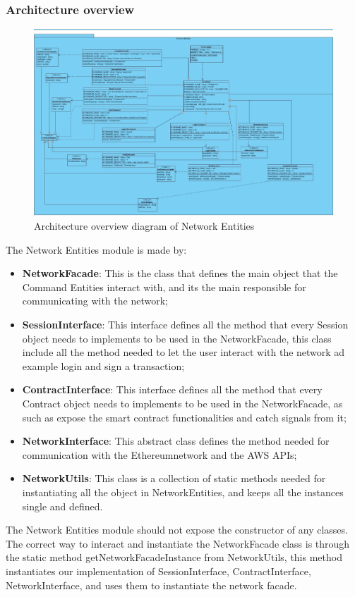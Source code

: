 \subsubsection{Architecture overview}
\begin{figure}[h]
	\centering
	\includegraphics[width=\textwidth]{./res/img/NetworkFacade.png}
	\caption{Architecture overview diagram of Network Entities}
\end{figure}
The Network Entities module is made by:
\begin{itemize}
    \item \textbf{NetworkFacade}: This is the class that defines the main object that the Command Entities interact with, and its the main responsible for communicating with the network;
    \item \textbf{SessionInterface}: This interface defines all the method that every Session object needs to implements to be used in the NetworkFacade, this class include all the method needed to let the user interact with the network ad example login and sign a transaction;
    \item \textbf{ContractInterface}: This interface defines all the method that every Contract object needs to implements to be used in the NetworkFacade, as such as expose the smart contract functionalities and catch signals from it;
    \item \textbf{NetworkInterface}: This abstract class defines the method needed for communication with the Ethereum\glo network and the AWS APIs;
    \item \textbf{NetworkUtils}: This class is a collection of static methods needed for instantiating all the object in NetworkEntities, and keeps all the instances single and defined.
\end{itemize}
The Network Entities module should not expose the constructor of any classes.
The correct way to interact and instantiate the NetworkFacade class is through the static method getNetworkFacadeInstance from NetworkUtils,
this method instantiates our implementation of SessionInterface, ContractInterface, NetworkInterface, and uses them to instantiate the network facade.
